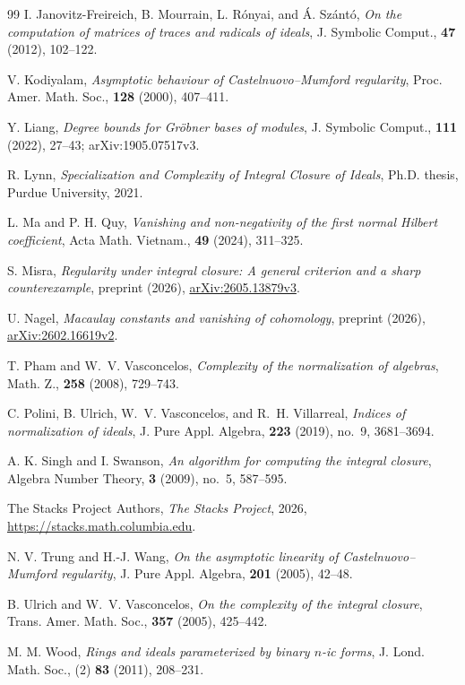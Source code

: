 \documentclass[12pt]{amsart}
\numberwithin{equation}{section}
\theoremstyle{definition}
\theoremstyle{remark}
\numberwithin{equation}{section}
\begin{document}
\begin{thebibliography}{99}
 I. Janovitz-Freireich, B. Mourrain, L. R\'onyai, and \'A. Sz\'ant\'o,
\emph{On the computation of matrices of traces and radicals of ideals},
J. Symbolic Comput.,  \textbf{47} (2012),   102--122.

 V. Kodiyalam,
\emph{Asymptotic behaviour of Castelnuovo--Mumford regularity},
Proc. Amer. Math. Soc.,  \textbf{128} (2000), 407--411.

 Y. Liang,
\emph{Degree bounds for Gr\"obner bases of modules},
J. Symbolic Comput.,  \textbf{111} (2022), 27--43; arXiv:1905.07517v3.

 R. Lynn,
\emph{Specialization and Complexity of Integral Closure of Ideals},
Ph.D. thesis, Purdue University, 2021.

 L. Ma and P. H. Quy,
\emph{Vanishing and non-negativity of the first normal Hilbert coefficient},
Acta Math. Vietnam.,  \textbf{49} (2024), 311--325.

 S. Misra,
\emph{Regularity under integral closure: A general criterion and a sharp counterexample},
preprint (2026), \href{https://arxiv.org/abs/2605.13879v3}{arXiv:2605.13879v3}.

 U. Nagel,
\emph{Macaulay constants and vanishing of cohomology},
preprint (2026), \href{https://arxiv.org/abs/2602.16619v2}{arXiv:2602.16619v2}.

 T. Pham and W.~V. Vasconcelos,
\emph{Complexity of the normalization of algebras},
Math. Z.,  \textbf{258} (2008), 729--743.

 C. Polini, B. Ulrich, W.~V. Vasconcelos, and R.~H. Villarreal,
\emph{Indices of normalization of ideals},
J. Pure Appl. Algebra,  \textbf{223} (2019), no.~9, 3681--3694.

 A. K. Singh and I. Swanson,
\emph{An algorithm for computing the integral closure},
Algebra Number Theory,  \textbf{3} (2009), no.~5, 587--595.

 The Stacks Project Authors,
\emph{The Stacks Project}, 2026,
\url{https://stacks.math.columbia.edu}.

 N. V. Trung and H.-J. Wang,
\emph{On the asymptotic linearity of Castelnuovo--Mumford regularity},
J. Pure Appl. Algebra, \textbf{201} (2005), 42--48.

 B. Ulrich and W.~V. Vasconcelos,
\emph{On the complexity of the integral closure},
Trans. Amer. Math. Soc.,  \textbf{357} (2005),   425--442.

 M. M. Wood,
\emph{Rings and ideals parameterized by binary $n$-ic forms},
J. Lond. Math. Soc.,  (2) \textbf{83} (2011),  208--231.

\end{thebibliography}
\end{document}
